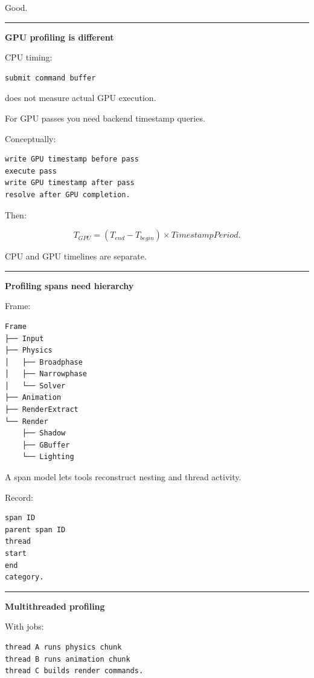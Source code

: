 Good.

\begin{center}\rule{0.5\linewidth}{0.5pt}\end{center}

\textbf{GPU profiling is different}

CPU timing:

\begin{verbatim}
submit command buffer
\end{verbatim}

does not measure actual GPU execution.

For GPU passes you need backend timestamp queries.

Conceptually:

\begin{verbatim}
write GPU timestamp before pass
execute pass
write GPU timestamp after pass
resolve after GPU completion.
\end{verbatim}

Then:

\[
T_{GPU}
=
(T_{end}-T_{begin})
\times TimestampPeriod.
\]

CPU and GPU timelines are separate.

\begin{center}\rule{0.5\linewidth}{0.5pt}\end{center}

\textbf{Profiling spans need hierarchy}

Frame:

\begin{verbatim}
Frame
├── Input
├── Physics
│   ├── Broadphase
│   ├── Narrowphase
│   └── Solver
├── Animation
├── RenderExtract
└── Render
    ├── Shadow
    ├── GBuffer
    └── Lighting
\end{verbatim}

A span model lets tools reconstruct nesting and thread activity.

Record:

\begin{verbatim}
span ID
parent span ID
thread
start
end
category.
\end{verbatim}

\begin{center}\rule{0.5\linewidth}{0.5pt}\end{center}

\textbf{Multithreaded profiling}

With jobs:

\begin{verbatim}
thread A runs physics chunk
thread B runs animation chunk
thread C builds render commands.
\end{verbatim}

